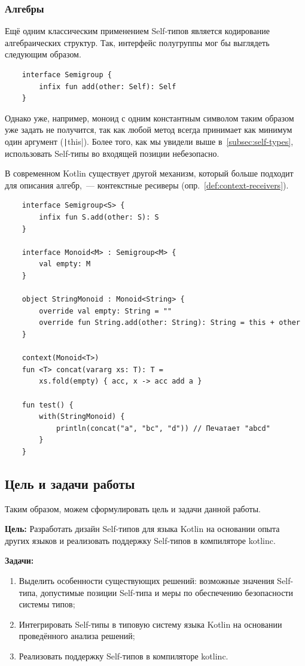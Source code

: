 \subsubsection{Алгебры} \label{subsubsec:algebras}

Ещё одним классическим применением Self-типов является кодирование алгебраических структур.
Так, интерфейс полугруппы мог бы выглядеть следующим образом.

\begin{verbatim}
    interface Semigroup {
        infix fun add(other: Self): Self
    }
\end{verbatim}

Однако уже, например, моноид с одним константным символом таким образом уже задать не получится, так как любой метод всегда принимает как минимум один аргумент (\texttt|this|).
Более того, как мы увидели выше в~\ref{subsec:self-types}, использовать Self-типы во входящей позиции небезопасно.

В современном Kotlin существует другой механизм, который больше подходит для описания алгебр,~--- контекстные ресиверы (опр.~\ref{def:context-receivers}).

\begin{verbatim}
    interface Semigroup<S> {
        infix fun S.add(other: S): S
    }

    interface Monoid<M> : Semigroup<M> {
        val empty: M
    }

    object StringMonoid : Monoid<String> {
        override val empty: String = ""
        override fun String.add(other: String): String = this + other
    }

    context(Monoid<T>)
    fun <T> concat(vararg xs: T): T =
        xs.fold(empty) { acc, x -> acc add a }

    fun test() {
        with(StringMonoid) {
            println(concat("a", "bc", "d")) // Печатает "abcd"
        }
    }
\end{verbatim}


\subsection{Цель и задачи работы}

Таким образом, можем сформулировать цель и задачи данной работы.

\textbf{Цель: } Разработать дизайн Self-типов для языка Kotlin на основании опыта других языков и реализовать поддержку Self-типов в компиляторе kotlinc.

\textbf{Задачи:}
\begin{enumerate}
    \item Выделить особенности существующих решений: возможные значения Self-типа, допустимые позиции Self-типа и меры по обеспечению безопасности системы типов;
    \item Интегрировать Self-типы в типовую систему языка Kotlin на основании проведённого анализа решений;
    \item Реализовать поддержку Self-типов в компиляторе kotlinc.
\end{enumerate}
